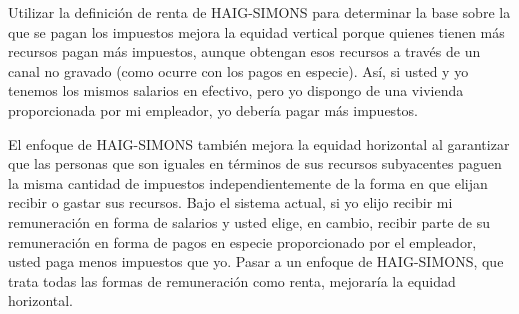 \documentclass[10pt,a4paper]{article}
\begin{document}
Utilizar la definición de renta de HAIG-SIMONS para determinar la base sobre la que se pagan los impuestos mejora la equidad vertical porque quienes tienen más recursos pagan más impuestos, aunque obtengan esos recursos a través de un canal no gravado (como ocurre con los pagos en especie). Así, si usted y yo tenemos los mismos salarios en efectivo, pero yo dispongo de una vivienda proporcionada por mi empleador, yo debería pagar más impuestos.

El enfoque de HAIG-SIMONS también mejora la equidad horizontal al garantizar que las personas que son iguales en términos de sus recursos subyacentes paguen la misma cantidad de impuestos independientemente de la forma en que elijan recibir o gastar sus recursos. Bajo el sistema actual, si yo elijo recibir mi remuneración en forma de salarios y usted elige, en cambio, recibir parte de su remuneración en forma de pagos en especie proporcionado por el empleador, usted paga menos impuestos que yo. Pasar a un enfoque de HAIG-SIMONS, que trata todas las formas de remuneración como renta, mejoraría la equidad horizontal.
\end{document}
